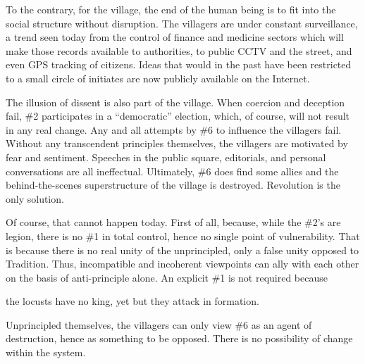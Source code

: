 To the contrary, for the village, the end of the human being is to fit into the social structure without disruption. The villagers are under constant surveillance, a trend seen today from the control of finance and medicine sectors which will make those records available to authorities, to public CCTV and the street, and even GPS tracking of citizens. Ideas that would in the past have been restricted to a small circle of initiates are now publicly available on the Internet.

The illusion of dissent is also part of the village. When coercion and deception fail, \#2 participates in a ``democratic'' election, which, of course, will not result in any real change. Any and all attempts by \#6 to influence the villagers fail. Without any transcendent principles themselves, the villagers are motivated by fear and sentiment. Speeches in the public square, editorials, and personal conversations are all ineffectual. Ultimately, \#6 does find some allies and the behind-the-scenes superstructure of the village is destroyed. Revolution is the only solution.

Of course, that cannot happen today. First of all, because, while the \#2's are legion, there is no \#1 in total control, hence no single point of vulnerability. That is because there is no real unity of the unprincipled, only a false unity opposed to Tradition. Thus, incompatible and incoherent viewpoints can ally with each other on the basis of anti-principle alone. An explicit \#1 is not required because

\begin{quotex}
the locusts have no king, yet but they attack in formation. 
\end{quotex}


Unprincipled themselves, the villagers can only view \#6 as an agent of destruction, hence as something to be opposed. There is no possibility of change within the system.



